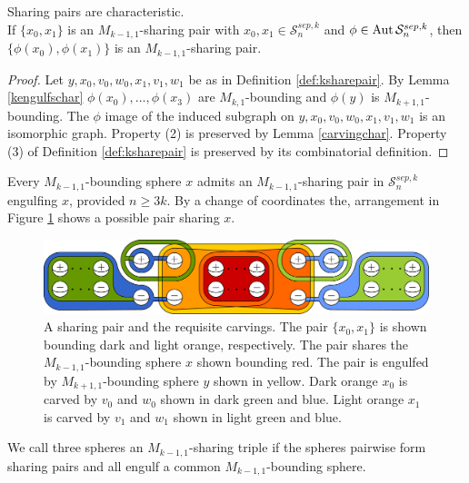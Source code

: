 \begin{lemma}
  Sharing pairs are characteristic.\\
  If $\{x_0,x_1\}$ is an $M_{k-1,1}$-sharing pair with $x_0,x_1 \in \mathcal S^{sep,k}_n$
  and $\phi \in \operatorname{Aut} \mathcal S^{sep,k}_n$,
  then $\{\phi(x_0),\phi(x_1)\}$ is an $M_{k-1,1}$-sharing pair.
  \label{lemma:sharepreserve}
\end{lemma}

\begin{proof}
  Let $y,x_0,v_0,w_0,x_1,v_1,w_1$ be as in Definition \ref{def:ksharepair}.
  By Lemma \ref{kengulfschar} $\phi(x_0),\ldots, \phi(x_3)$
  are $M_{k,1}$-bounding and $\phi(y)$ is $M_{k+1,1}$-bounding.
  The $\phi$ image of the induced subgraph on $y,x_0,v_0,w_0,x_1,v_1,w_1$
  is an isomorphic graph.
  Property (2) is preserved by Lemma \ref{carvingchar}.
  Property (3) of Definition \ref{def:ksharepair}
  is preserved by its combinatorial definition.
\end{proof}


\begin{remark}
  Every $M_{k-1,1}$-bounding sphere $x$ admits an $M_{k-1,1}$-sharing pair in
  $\mathcal S^{sep,k}_{n}$ engulfing $x$, provided $n\geq 3k$.
  By a change of coordinates the,
  arrangement in Figure \ref{fig:ksharing} shows a possible pair sharing $x$.

  \begin{figure}[h!]
  \includegraphics[width=\textwidth]{figures/ksharingnotpent.pdf}
  \caption{
    A sharing pair and the requisite carvings.
    The pair $\{x_0,x_1\}$ is shown bounding dark and light orange, respectively.
    The pair shares the $M_{k-1,1}$-bounding sphere $x$ shown bounding red.
    The pair is engulfed by $M_{k+1,1}$-bounding sphere $y$ shown in yellow.
    Dark orange $x_0$ is carved by $v_0$ and $w_0$ shown in dark green and blue.
    Light orange $x_1$ is carved by $v_1$ and $w_1$ shown in light green and blue.
  }
  \label{fig:ksharing}
  \end{figure}
\end{remark}


We call three spheres an $M_{k-1,1}$-sharing triple if
the spheres pairwise form sharing pairs and all engulf
a common $M_{k-1,1}$-bounding sphere.

